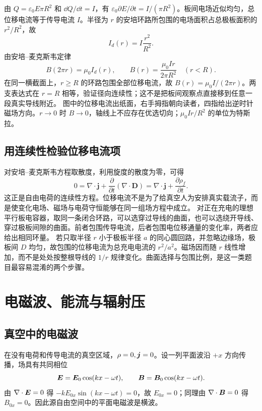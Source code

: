 {\begin{xesolution}
由 $Q=\varepsilon_0E\pi R^2$ 和 $\dd Q/\dd t=I$，有 $\varepsilon_0\partial E/\partial t=I/(\pi R^2)$。板间电场近似均匀，总位移电流等于传导电流 $I$。半径为 $r$ 的安培环路所包围的电场面积占总极板面积的 $r^2/R^2$，故
\[
 I_d(r)=I\frac{r^2}{R^2}.
\]
由安培--麦克斯韦定律
\[
 B(2\pi r)=\mu_0I_d(r),
 \qquad
 \boxed{B(r)=\frac{\mu_0Ir}{2\pi R^2}\quad(r<R)}.
\]
在同一横截面上，$r\ge R$ 的环路包围全部位移电流，故 $B(r)=\mu_0I/(2\pi r)$。两支表达式在 $r=R$ 相等，验证径向连续性；这不是把板间观察点直接移到任意一段真实导线附近。
图中的位移电流出纸面，右手拇指朝向读者，四指给出逆时针磁场方向。$r\to0$ 时 $B\to0$，轴线上不应存在优选切向；$\mu_0Ir/R^2$ 的单位为特斯拉。
\end{xesolution}


\subsection{用连续性检验位移电流项}
对安培--麦克斯韦方程取散度，利用旋度的散度为零，可得
\[
 0=\nabla\cdot\boldsymbol j+\frac{\partial}{\partial t}(\nabla\cdot\boldsymbol D)
 =\nabla\cdot\boldsymbol j+\frac{\partial\rho_f}{\partial t}.
\]
这正是自由电荷的连续性方程。位移电流不是为了给真空人为安排真实载流子，而是使变化电场、磁场与电荷守恒能够在同一组场方程中成立。
对正在充电的理想平行板电容器，取同一条闭合环路，可以选穿过导线的曲面，也可以选绕开导线、穿过极板间隙的曲面。前者包围传导电流，后者包围电位移通量的变化率，两者应给出相同环量。
若只取半径 $r$ 小于极板半径 $a$ 的同心圆回路，并忽略边缘场，极板间 $D$ 均匀，故包围的位移电流为总充电电流的 $r^2/a^2$。磁场因而随 $r$ 线性增加，而不是处处按整根导线的 $1/r$ 规律变化。曲面选择与包围比例，是这一类题目最容易混淆的两个步骤。


\section{电磁波、能流与辐射压}

\subsection{真空中的电磁波}


在没有电荷和传导电流的真空区域，$\rho=0,\bm{j}=0$。设一列平面波沿 $+x$ 方向传播，场具有共同相位
\begin{equation}
  \bm{E}=\bm{E}_0\cos(kx-\omega t),
  \qquad
  \bm{B}=\bm{B}_0\cos(kx-\omega t).
\end{equation}
由 $\nabla\cdot\bm{E}=0$ 得 $-kE_{0x}\sin(kx-\omega t)=0$，故 $E_{0x}=0$；同理由
$\nabla\cdot\bm{B}=0$ 得 $B_{0x}=0$。因此源自由空间中的平面电磁波是横波。

}
